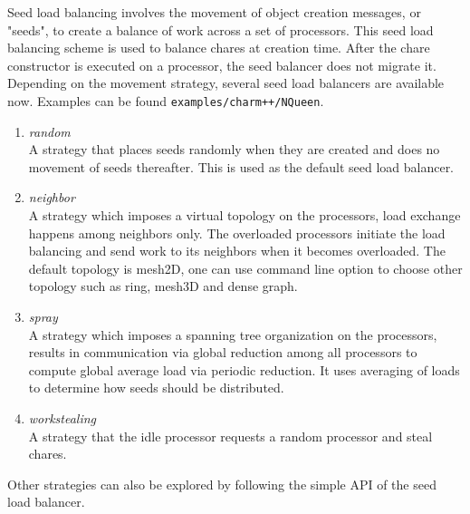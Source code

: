 \label{seedlb}

Seed load balancing involves the movement of object creation messages, or
"seeds", to create a balance of work across a set of processors. 
This seed load balancing scheme is used to balance chares  at creation time.
After the chare constructor is executed on a processor, the seed balancer does not
migrate it.
Depending on the movement strategy, several seed load balancers are available now.
Examples can be found {\tt examples/charm++/NQueen}.
\begin{enumerate}
\item {\em random}\\  
 A strategy that places seeds randomly when they are created and does
no movement of seeds thereafter. This is used as the default seed 
load balancer.
\item {\em neighbor}\\  
 A strategy which imposes a virtual topology on the processors,
 load exchange happens among neighbors only. The overloaded processors
 initiate the load balancing and send work to its neighbors
 when it becomes overloaded. The default topology is mesh2D, one can use
 command line option to choose other topology such as ring, mesh3D and 
 dense graph.
\item {\em spray}\\  
 A strategy which imposes a spanning tree organization on the processors,
 results in communication via global reduction among all processors 
 to compute global average load via periodic reduction. 
 It uses averaging of loads to determine how seeds should be
distributed.
\item  {\em workstealing} \\
 A strategy that the idle processor requests a random processor and steal 
 chares.
\end{enumerate}

Other strategies can also be explored by following the simple API of the 
seed load balancer.
\linebreak

